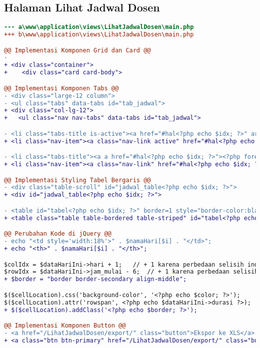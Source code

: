 \subsection{Halaman	Lihat Jadwal Dosen}
\begin{lstlisting}[language=diff, caption=Kode untuk Halaman Lihat Jadwal Dosen, label=Entri, basicstyle=\ttfamily, frame=single,
columns=fullflexible, keepspaces=true, breaklines=true]
--- a\www\application\views\LihatJadwalDosen\main.php
+++ b\www\application\views\LihatJadwalDosen\main.php

@@ Implementasi Komponen Grid dan Card @@
-
+ <div class="container">
+    <div class="card card-body">

@@ Implementasi Komponen Tabs @@
- <div class="large-12 column">
- <ul class="tabs" data-tabs id="tab_jadwal">
+ <div class="col-lg-12">
+	<ul class="nav nav-tabs" data-tabs id="tab_jadwal">

- <li class="tabs-title is-active"><a href="#hal<?php echo $idx; ?>" aria-selected="true"><?php foreach ($currRow as $data) {
+ <li class="nav-item"><a class="nav-link active" href="#hal<?php echo $idx; ?>" 

- <li class="tabs-title"><a a href="#hal<?php echo $idx; ?>"><?php foreach ($currRow as $data) {
+ <li class="nav-item"><a class="nav-link" href="#hal<?php echo $idx; ?>"><?php foreach ($currRow as $data) {

@@ Implementasi Styling Tabel Bergaris @@
- <div class="table-scroll" id="jadwal_table<?php echo $idx; ?>">
+ <div id="jadwal_table<?php echo $idx; ?>">

- <table id="tabel<?php echo $idx; ?>" border=1 style="border-color:black ; border-collapse:separate">
+ <table class="table table-bordered table-striped" id="tabel<?php echo $idx; ?>" >

@@ Perubahan Kode di jQuery @@
- echo "<td style='width:18%'>" . $namaHari[$i] . "</td>";
+ echo "<th>" . $namaHari[$i] . "</th>";

$colIdx = $dataHariIni->hari + 1;   // + 1 karena perbedaan selisih index tabel dan value hari di database 
$rowIdx = $dataHariIni->jam_mulai - 6;  // + 1 karena perbedaan selisih index tabel dan value jam_mulai di database 
+ $border = "border border-secondary align-middle";

$($cellLocation).css('background-color', '<?php echo $color; ?>');
$($cellLocation).attr('rowspan', <?php echo $dataHariIni->durasi ?>);
+ $($cellLocation).addClass('<?php echo $border; ?>');

@@ Implementasi Komponen Button @@
- <a href="/LihatJadwalDosen/export/" class="button">Ekspor ke XLS</a>
+ <a class="btn btn-primary" href="/LihatJadwalDosen/export/" class="button">Ekspor ke XLS</a>
\end{lstlisting}


